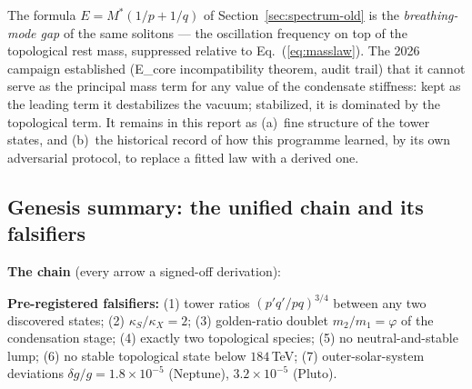The formula $E=M^{*}(1/p+1/q)$ of Section~\ref{sec:spectrum-old} is the \emph{breathing-mode
gap} of the same solitons --- the oscillation frequency on top of the topological rest mass,
suppressed relative to Eq.~(\ref{eq:masslaw}). The 2026 campaign established
(E\_core incompatibility theorem, audit trail) that it cannot serve as the principal mass
term for any value of the condensate stiffness: kept as the leading term it destabilizes the
vacuum; stabilized, it is dominated by the topological term. It remains in this report as
(a)~fine structure of the tower states, and (b)~the historical record of how this programme
learned, by its own adversarial protocol, to replace a fitted law with a derived one.

\subsection{Genesis summary: the unified chain and its falsifiers}

\begin{mdframed}[backgroundcolor=green!5]
\textbf{The chain} (every arrow a signed-off derivation):
\begin{center}
\end{center}
\textbf{Pre-registered falsifiers:} (1) tower ratios $(p'q'/pq)^{3/4}$ between any two
discovered states; (2) $\kappa_S/\kappa_X=2$; (3) golden-ratio doublet $m_2/m_1=\varphi$ of
the condensation stage; (4) exactly two topological species; (5) no neutral-and-stable lump;
(6) no stable topological state below $184$\,TeV; (7) outer-solar-system deviations
$\delta g/g = 1.8\times10^{-5}$ (Neptune), $3.2\times10^{-5}$ (Pluto).
\end{mdframed}

